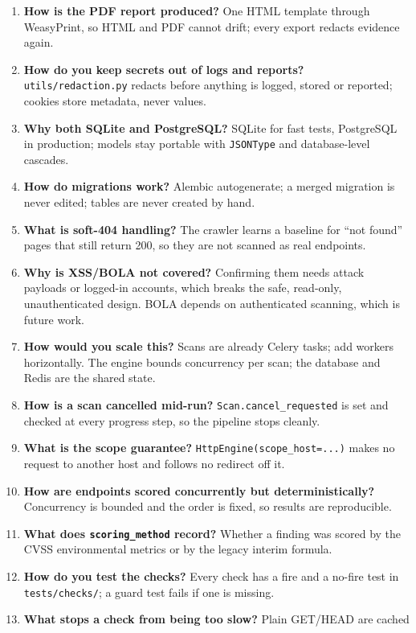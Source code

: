 \begin{enumerate}[leftmargin=*,itemsep=3pt]
the crawler never requests routes named like actions (\texttt{/logout},
\texttt{/createdb}).
\item \textbf{How is the PDF report produced?} One HTML template through
WeasyPrint, so HTML and PDF cannot drift; every export redacts evidence again.
\item \textbf{How do you keep secrets out of logs and reports?}
\texttt{utils/redaction.py} redacts before anything is logged, stored or
reported; cookies store metadata, never values.
\item \textbf{Why both SQLite and PostgreSQL?} SQLite for fast tests, PostgreSQL
in production; models stay portable with \texttt{JSONType} and database-level
cascades.
\item \textbf{How do migrations work?} Alembic autogenerate; a merged migration
is never edited; tables are never created by hand.
\item \textbf{What is soft-404 handling?} The crawler learns a baseline for
``not found'' pages that still return 200, so they are not scanned as real
endpoints.
\item \textbf{Why is XSS/BOLA not covered?} Confirming them needs attack payloads
or logged-in accounts, which breaks the safe, read-only, unauthenticated design.
BOLA depends on authenticated scanning, which is future work.
\item \textbf{How would you scale this?} Scans are already Celery tasks; add
workers horizontally. The engine bounds concurrency per scan; the database and
Redis are the shared state.
\item \textbf{How is a scan cancelled mid-run?} \texttt{Scan.cancel\_requested}
is set and checked at every progress step, so the pipeline stops cleanly.
\item \textbf{What is the scope guarantee?} \texttt{HttpEngine(scope\_host=...)}
makes no request to another host and follows no redirect off it.
\item \textbf{How are endpoints scored concurrently but deterministically?}
Concurrency is bounded and the order is fixed, so results are reproducible.
\item \textbf{What does \texttt{scoring\_method} record?} Whether a finding was
scored by the CVSS environmental metrics or by the legacy interim formula.
\item \textbf{How do you test the checks?} Every check has a fire and a no-fire
test in \texttt{tests/checks/}; a guard test fails if one is missing.
\item \textbf{What stops a check from being too slow?} Plain GET/HEAD are cached

\end{enumerate}

